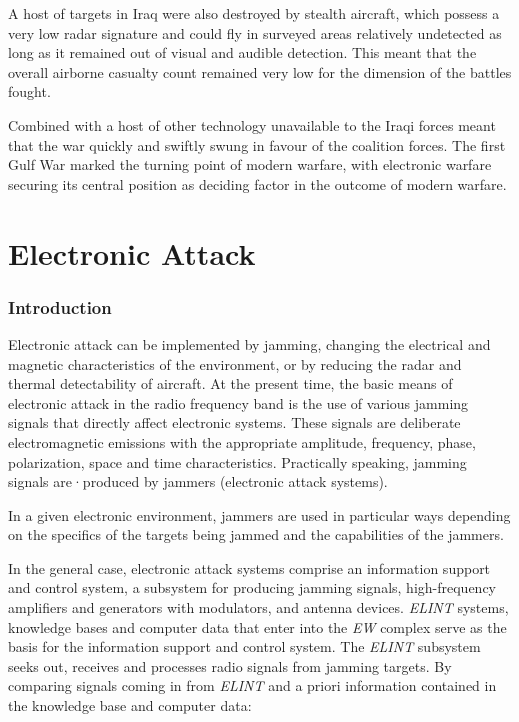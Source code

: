 \documentclass[english,purist]{ist-report}
\begin{document}
A host of targets in Iraq were also destroyed by stealth aircraft, which possess a very low radar signature and could fly in surveyed areas relatively undetected as long as it remained out of visual and audible detection. This meant that the overall airborne casualty count remained very low for the dimension of the battles fought.

Combined with a host of other technology unavailable to the Iraqi forces meant that the war quickly and swiftly swung in favour of the coalition forces. The first Gulf War marked the turning point of modern warfare, with electronic warfare securing its central position as deciding factor in the outcome of modern warfare.

\pagebreak
\part{Electronic Attack}

\section{Introduction}

Electronic attack can be implemented by jamming, changing the electrical and magnetic characteristics of the environment, or by reducing the radar and thermal detectability of aircraft.
At the present time, the basic means of electronic attack in the radio
frequency band is the use of various jamming signals that directly affect electronic systems. These signals are deliberate electromagnetic emissions with the appropriate amplitude, frequency, phase, polarization, space and time characteristics. Practically speaking, jamming signals are·produced by jammers (electronic attack systems). 

In a given electronic environment, jammers are used in particular ways
depending on the specifics of the targets being jammed and the capabilities of the jammers. 

In the general case, electronic attack systems comprise an information
support and control system, a subsystem for producing jamming signals,
high-frequency amplifiers and generators with modulators, and antenna
devices. \textit{ELINT} systems, knowledge bases and computer data that enter into the \textit{EW} complex serve as the basis for the information support and control system. The \textit{ELINT} subsystem seeks out, receives and processes radio signals from jamming targets. By comparing signals coming in from \textit{ELINT} and a priori information contained in the knowledge base and computer data: 
\end{document}
